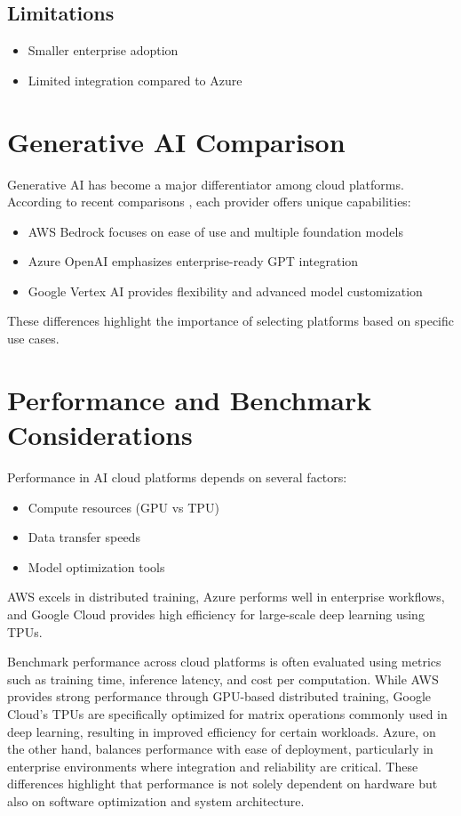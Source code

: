\documentclass[conference]{IEEEtran}
\begin{document}
	\subsection{Limitations}
	\begin{itemize}
		\item Smaller enterprise adoption
		\item Limited integration compared to Azure
	\end{itemize}
	
	\section{Generative AI Comparison}
	Generative AI has become a major differentiator among cloud platforms. According to recent comparisons \cite{bedrock_compare}, each provider offers unique capabilities:
	
	\begin{itemize}
		\item AWS Bedrock focuses on ease of use and multiple foundation models
		\item Azure OpenAI emphasizes enterprise-ready GPT integration
		\item Google Vertex AI provides flexibility and advanced model customization
	\end{itemize}
	
	These differences highlight the importance of selecting platforms based on specific use cases.
	
	\section{Performance and Benchmark Considerations}
	Performance in AI cloud platforms depends on several factors:
	
	\begin{itemize}
		\item Compute resources (GPU vs TPU)
		\item Data transfer speeds
		\item Model optimization tools
	\end{itemize}
	
	AWS excels in distributed training, Azure performs well in enterprise workflows, and Google Cloud provides high efficiency for large-scale deep learning using TPUs.
	
	Benchmark performance across cloud platforms is often evaluated using metrics such as training time, inference latency, and cost per computation. While AWS provides strong performance through GPU-based distributed training, Google Cloud’s TPUs are specifically optimized for matrix operations commonly used in deep learning, resulting in improved efficiency for certain workloads. Azure, on the other hand, balances performance with ease of deployment, particularly in enterprise environments where integration and reliability are critical. These differences highlight that performance is not solely dependent on hardware but also on software optimization and system architecture.
	
\end{document}
